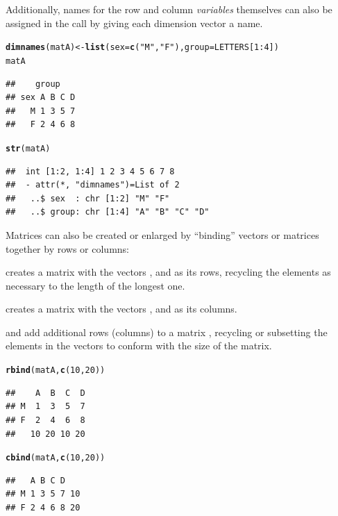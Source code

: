 \documentclass[11pt]{book}\usepackage[]{graphicx}\usepackage[]{color}
\makeatletter
\newcommand{\hlnum}[1]{\textcolor[rgb]{0.686,0.059,0.569}{#1}}%
\newcommand{\hlstr}[1]{\textcolor[rgb]{0.192,0.494,0.8}{#1}}%
\newcommand{\hlopt}[1]{\textcolor[rgb]{0,0,0}{#1}}%
\newcommand{\hlstd}[1]{\textcolor[rgb]{0.345,0.345,0.345}{#1}}%
\newcommand{\hlkwb}[1]{\textcolor[rgb]{0.69,0.353,0.396}{#1}}%
\newcommand{\hlkwc}[1]{\textcolor[rgb]{0.333,0.667,0.333}{#1}}%
\newcommand{\hlkwd}[1]{\textcolor[rgb]{0.737,0.353,0.396}{\textbf{#1}}}%
\newenvironment{kframe}{%
 \def\at@end@of@kframe{}%
 \ifinner\ifhmode%
  \def\at@end@of@kframe{\end{minipage}}%
  \begin{minipage}{\columnwidth}%
 \fi\fi%
 \def\FrameCommand##1{\hskip\@totalleftmargin \hskip-\fboxsep
 \colorbox{shadecolor}{##1}\hskip-\fboxsep
     \hskip-\linewidth \hskip-\@totalleftmargin \hskip\columnwidth}%
 \MakeFramed {\advance\hsize-\width
   \@totalleftmargin\z@ \linewidth\hsize
   \@setminipage}}%
 {\par\unskip\endMakeFramed%
 \at@end@of@kframe}
\newenvironment{knitrout}{}{} %
\renewenvironment{knitrout}{\small\renewcommand{\baselinestretch}{.85}}{} %
\makeatother
\begin{document}
Additionally, names for the row and column \emph{variables} themselves can also be assigned in the
 call by giving each dimension vector a name.
\begin{knitrout}
\color{fgcolor}\begin{kframe}
\begin{alltt}
\hlkwd{dimnames}\hlstd{(matA)} \hlkwb{<-} \hlkwd{list}\hlstd{(}\hlkwc{sex}\hlstd{=}\hlkwd{c}\hlstd{(}\hlstr{"M"}\hlstd{,}\hlstr{"F"}\hlstd{),} \hlkwc{group}\hlstd{=LETTERS[}\hlnum{1}\hlopt{:}\hlnum{4}\hlstd{])}
\hlstd{matA}
\end{alltt}
\begin{verbatim}
##    group
## sex A B C D
##   M 1 3 5 7
##   F 2 4 6 8
\end{verbatim}
\begin{alltt}
\hlkwd{str}\hlstd{(matA)}
\end{alltt}
\begin{verbatim}
##  int [1:2, 1:4] 1 2 3 4 5 6 7 8
##  - attr(*, "dimnames")=List of 2
##   ..$ sex  : chr [1:2] "M" "F"
##   ..$ group: chr [1:4] "A" "B" "C" "D"
\end{verbatim}
\end{kframe}
\end{knitrout}


Matrices can also be created or enlarged by ``binding'' vectors or matrices together
by rows or columns:
\begin{itemize*}
  \item {} creates a matrix with the vectors ,  and  as its rows, recycling the elements as necessary to the length of the longest one.
  \item {} creates a matrix with the vectors ,  and  as its columns.
  \item {} and  add additional
  rows (columns) to a matrix , recycling or subsetting the elements in the
  vectors to conform with the size of the matrix.
\end{itemize*}

\begin{knitrout}
\color{fgcolor}\begin{kframe}
\begin{alltt}
\hlkwd{rbind}\hlstd{(matA,} \hlkwd{c}\hlstd{(}\hlnum{10}\hlstd{,}\hlnum{20}\hlstd{))}
\end{alltt}
\begin{verbatim}
##    A  B  C  D
## M  1  3  5  7
## F  2  4  6  8
##   10 20 10 20
\end{verbatim}
\begin{alltt}
\hlkwd{cbind}\hlstd{(matA,} \hlkwd{c}\hlstd{(}\hlnum{10}\hlstd{,}\hlnum{20}\hlstd{))}
\end{alltt}
\begin{verbatim}
##   A B C D   
## M 1 3 5 7 10
## F 2 4 6 8 20
\end{verbatim}
\end{kframe}
\end{knitrout}
\end{document}
